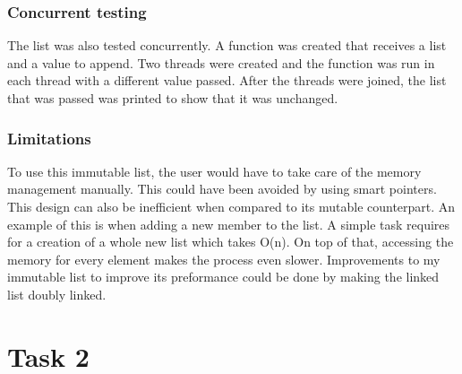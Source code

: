 \documentclass[a4paper, 12pt]{report}
\begin{document}
\subsubsection{Concurrent testing}
The list was also tested concurrently. A function was created that receives a list and a value to append. Two threads were created and the function was run in each thread with a different value passed. After the threads were joined, the list that was passed was printed to show that it was unchanged.

\subsubsection{Limitations}
To use this immutable list, the user would have to take care of the memory management manually. This could have been avoided by using smart pointers.
\linebreak
This design can also be inefficient when compared to its mutable counterpart. An example of this is when adding a new member to the list. A simple task requires for a creation of a whole new list which takes O(n). On top of that, accessing the memory for every element makes the process even slower. Improvements to my immutable list to improve its preformance could be done by making the linked list doubly linked.

\section{Task 2}
\end{document}
